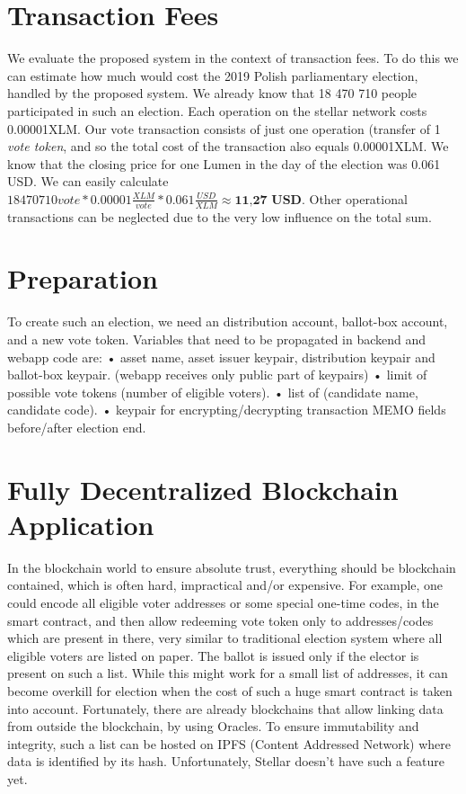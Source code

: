 \documentclass[runningheads]{llncs}
\begin{document}
\section{Transaction Fees}
We evaluate the proposed system in the context of transaction fees. To do this we can estimate how much would cost the 2019 Polish parliamentary election, handled by the proposed system. We already know that 18 470 710 people participated in such an election. Each operation on the stellar network costs 0.00001XLM. Our vote transaction consists of just one operation (transfer of 1 \textit{vote token}, and so the total cost of the transaction also equals 0.00001XLM. We know that the closing price for one Lumen in the day of the election was 0.061 USD. We can easily calculate \(18470710 vote * 0.00001 \frac{XLM}{vote} * 0.061 \frac{USD}{XLM} \approx \textbf{11,27 USD}\). Other operational transactions can be neglected due to the very low influence on the total sum.

\section{Preparation}
To create such an election, we need an distribution account, ballot-box account, and a new vote token. Variables that need to be propagated in backend and webapp code are:
• asset name, asset issuer keypair, distribution keypair and ballot-box keypair. (webapp receives only public part of keypairs)
• limit of possible vote tokens (number of eligible voters). 
• list of (candidate name, candidate code).
• keypair for encrypting/decrypting transaction MEMO fields before/after election end.


\section{Fully Decentralized Blockchain Application}
In the blockchain world to ensure absolute trust, everything should be blockchain contained, which is often hard, impractical and/or expensive. For example, one could encode all eligible voter addresses or some special one-time codes, in the smart contract, and then allow redeeming vote token only to addresses/codes which are present in there, very similar to traditional election system where all eligible voters are listed on paper. The ballot is issued only if the elector is present on such a list. While this might work for a small list of addresses, it can become overkill for election when the cost of such a huge smart contract is taken into account. Fortunately, there are already blockchains that allow linking data from outside the blockchain, by using Oracles. To ensure immutability and integrity, such a list can be hosted on IPFS (Content Addressed Network) where data is identified by its hash. Unfortunately, Stellar doesn't have such a feature yet.
\end{document}

